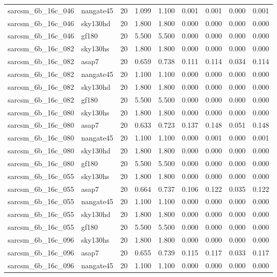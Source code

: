 \begin{tabular}{llrrrrrrr}
sarcsm\_6b\_16c\_046 & nangate45 & 20 & 1.099 & 1.100 & 0.001 & 0.001 & 0.000 & 0.001 \\
sarcsm\_6b\_16c\_046 & sky130hd & 20 & 1.800 & 1.800 & 0.000 & 0.000 & 0.000 & 0.000 \\
sarcsm\_6b\_16c\_046 & gf180 & 20 & 5.500 & 5.500 & 0.000 & 0.000 & 0.000 & 0.000 \\
sarcsm\_6b\_16c\_082 & sky130hs & 20 & 1.800 & 1.800 & 0.000 & 0.000 & 0.000 & 0.000 \\
sarcsm\_6b\_16c\_082 & asap7 & 20 & 0.659 & 0.738 & 0.111 & 0.114 & 0.034 & 0.114 \\
sarcsm\_6b\_16c\_082 & nangate45 & 20 & 1.100 & 1.100 & 0.000 & 0.000 & 0.000 & 0.000 \\
sarcsm\_6b\_16c\_082 & sky130hd & 20 & 1.800 & 1.800 & 0.000 & 0.000 & 0.000 & 0.000 \\
sarcsm\_6b\_16c\_082 & gf180 & 20 & 5.500 & 5.500 & 0.000 & 0.000 & 0.000 & 0.000 \\
sarcsm\_6b\_16c\_080 & sky130hs & 20 & 1.800 & 1.800 & 0.000 & 0.000 & 0.000 & 0.000 \\
sarcsm\_6b\_16c\_080 & asap7 & 20 & 0.633 & 0.723 & 0.137 & 0.148 & 0.051 & 0.148 \\
sarcsm\_6b\_16c\_080 & nangate45 & 20 & 1.100 & 1.100 & 0.000 & 0.001 & 0.000 & 0.001 \\
sarcsm\_6b\_16c\_080 & sky130hd & 20 & 1.800 & 1.800 & 0.000 & 0.000 & 0.000 & 0.000 \\
sarcsm\_6b\_16c\_080 & gf180 & 20 & 5.500 & 5.500 & 0.000 & 0.000 & 0.000 & 0.000 \\
sarcsm\_6b\_16c\_055 & sky130hs & 20 & 1.800 & 1.800 & 0.000 & 0.000 & 0.000 & 0.000 \\
sarcsm\_6b\_16c\_055 & asap7 & 20 & 0.664 & 0.737 & 0.106 & 0.122 & 0.035 & 0.122 \\
sarcsm\_6b\_16c\_055 & nangate45 & 20 & 1.100 & 1.100 & 0.000 & 0.000 & 0.000 & 0.000 \\
sarcsm\_6b\_16c\_055 & sky130hd & 20 & 1.800 & 1.800 & 0.000 & 0.000 & 0.000 & 0.000 \\
sarcsm\_6b\_16c\_055 & gf180 & 20 & 5.500 & 5.500 & 0.000 & 0.000 & 0.000 & 0.000 \\
sarcsm\_6b\_16c\_096 & sky130hs & 20 & 1.800 & 1.800 & 0.000 & 0.000 & 0.000 & 0.000 \\
sarcsm\_6b\_16c\_096 & asap7 & 20 & 0.655 & 0.739 & 0.115 & 0.117 & 0.033 & 0.117 \\
sarcsm\_6b\_16c\_096 & nangate45 & 20 & 1.100 & 1.100 & 0.000 & 0.000 & 0.000 & 0.000 \\

\end{tabular}
